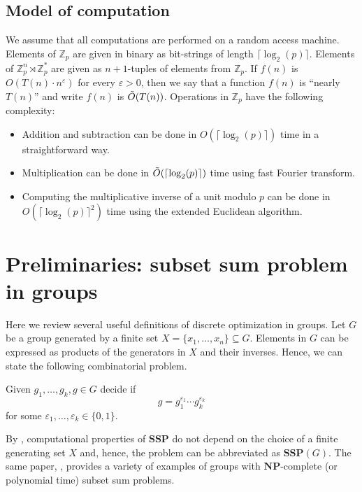 \documentclass{jgcc}
\def\NP{{\mathbf{NP}}}
\def\MZ{{\mathbb{Z}}}
\def\SSP{{\mathbf{SSP}}}
\begin{document}
\subsection{Model of computation}

We assume that all computations are performed on a random access machine.
Elements of $\MZ_p$ are given in binary as bit-strings of length
$\lceil \log_2(p) \rceil$.
Elements of $\MZ_p^n\rtimes \MZ_p^\ast$ are given 
as $n+1$-tuples of elements from $\MZ_p$.
If $f(n)$ is $O(T(n)\cdot n^{\varepsilon})$ for every $\varepsilon>0$, then
we say that a function $f(n)$ is ``nearly $T(n)$'' 
and write $f(n)$ is $\Tilde{O}(T(n))$.
Operations in $\MZ_p$ have the following complexity:
\begin{itemize}
\item 
Addition and subtraction can be done in $O(\lceil \log_2(p) \rceil)$
time in a straightforward way.
\item
Multiplication can be done in 
$\Tilde{O}(\lceil \log_2(p) \rceil)$ time using fast Fourier transform.
\item
Computing the multiplicative inverse of a unit modulo $p$ can be done in 
$O(\lceil \log_2(p) \rceil^2)$ time using the extended Euclidean algorithm.
\end{itemize}





\section{Preliminaries: subset sum problem in groups}

Here we review several useful definitions of discrete optimization in groups.
Let $G$ be a group generated by a finite set 
$X=\{x_1,\ldots,x_n\}\subseteq G$. Elements in $G$ can be expressed
as products of the generators in $X$ and their inverses.
Hence, we can state the following combinatorial problem.

\medskip
\noindent{\bf The subset sum  problem $\SSP(G,X)$\index{$\SSP(G,X)$}:}
Given $g_1,\ldots,g_k,g\in G$ decide if
  \begin{equation} \label{eq:SSP-def}
  g = g_1^{\varepsilon_1} \cdots g_k^{\varepsilon_k}
  \end{equation}
for some $\varepsilon_1,\ldots,\varepsilon_k \in \{0,1\}$.

\medskip
By \cite[Proposition 2.5]{Miasnikov-Nikolaev-Ushakov:2015},
computational properties of $\SSP$ do not depend on the choice of a finite generating set $X$
and, hence, the problem can be abbreviated as $\SSP(G)$.
The same paper, \cite{Miasnikov-Nikolaev-Ushakov:2015},
provides a variety of examples
of groups with $\NP$-complete (or polynomial time) subset sum problems.
\end{document}
